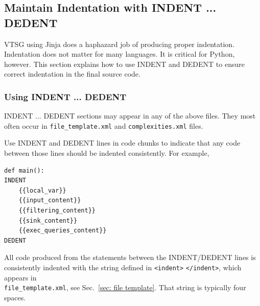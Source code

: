 \subsection{Maintain Indentation with INDENT ... DEDENT}
\label{sec:indent}

VTSG using Jinja does a haphazard job of producing proper indentation.  Indentation
does not matter for many languages.  It is critical for Python, however.  This
section explains how to use INDENT and DEDENT to ensure correct indentation in the
final source code.

\subsubsection{Using INDENT ... DEDENT}
INDENT ... DEDENT sections may appear in any of the above files.  They
most often occur in \verb|file_template.xml| and \verb|complexities.xml| files.

Use INDENT and DEDENT lines in code chunks to indicate that
any code between those lines should be indented consistently.  For example,
\begin{verbatim}
def main():
INDENT
    {{local_var}}
    {{input_content}}
    {{filtering_content}}
    {{sink_content}}
    {{exec_queries_content}}
DEDENT
\end{verbatim}
All code produced from the statements between the INDENT/DEDENT lines is
consistently indented with the string defined in \verb|<indent>| \verb|</indent>|,
which appears in \\ \verb|file_template.xml|, see Sec.~\ref{sec: file template}.
That string is typically four spaces.

